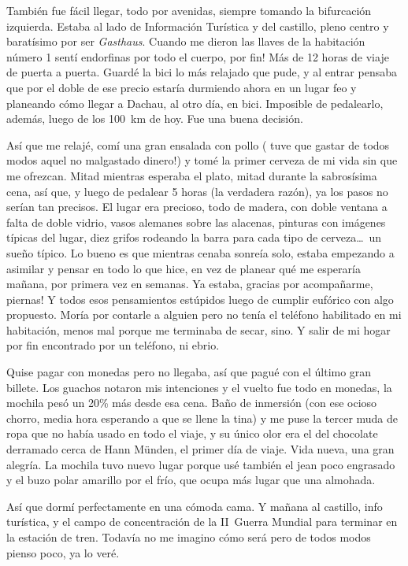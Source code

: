Tambi\'en fue f\'acil llegar, todo por avenidas, siempre tomando la
bifurcaci\'on izquierda. Estaba al lado de Informaci\'on Tur\'istica y del
castillo, pleno centro y barat\'isimo por ser \emph{Gasthaus}. Cuando me
dieron las llaves de la habitaci\'on n\'umero 1 sent\'i endorfinas por todo el
cuerpo, \textexclamdown por fin! M\'as de 12 horas de viaje de puerta a
puerta. Guard\'e la bici lo m\'as relajado que pude, y al entrar pensaba que
por el doble de ese precio estar\'ia durmiendo ahora en un lugar feo y
planeando c\'omo llegar a Dachau, al otro d\'ia, en bici. Imposible de
pedalearlo, adem\'as, luego de los 100~km de hoy. Fue una buena decisi\'on.

As\'i que me relaj\'e, com\'i una gran ensalada con pollo (\textexclamdown
tuve que gastar de todos modos aquel no malgastado dinero!) y tom\'e la primer
cerveza de mi vida sin que me ofrezcan. Mitad mientras esperaba el plato,
mitad durante la sabros\'isima cena, as\'i que, y luego de pedalear 5 horas
(la verdadera raz\'on), ya los pasos no ser\'ian tan precisos. El lugar era
precioso, todo de madera, con doble ventana a falta de doble vidrio, vasos
alemanes sobre las alacenas, pinturas con im\'agenes t\'ipicas del lugar, diez
grifos rodeando la barra para cada tipo de cerveza\ldots\ un sue\~no t\'ipico.
Lo bueno es que mientras cenaba sonre\'ia solo, estaba empezando a asimilar y
pensar en todo lo que hice, en vez de planear qu\'e me esperar\'ia ma\~nana,
por primera vez en semanas. Ya estaba, \textexclamdown gracias por
acompa\~narme, piernas! Y todos esos pensamientos est\'upidos luego de cumplir
euf\'orico con algo propuesto. Mor\'ia por contarle a alguien pero no ten\'ia
el tel\'efono habilitado en mi habitaci\'on, menos mal porque me terminaba de
secar, sino. Y salir de mi hogar por fin encontrado por un tel\'efono, ni
ebrio.

Quise pagar con monedas pero no llegaba, as\'i que pagu\'e con el \'ultimo
gran billete. Los guachos notaron mis intenciones y el vuelto fue todo en
monedas, la mochila pes\'o un 20\% m\'as desde esa cena. Ba\~no de inmersi\'on
(con ese ocioso chorro, media hora esperando a que se llene la tina) y me puse
la tercer muda de ropa que no hab\'ia usado en todo el viaje, y su \'unico
olor era el del chocolate derramado cerca de Hann M\"unden, el primer d\'ia de
viaje. Vida nueva, una gran alegr\'ia. La mochila tuvo nuevo lugar
porque us\'e tambi\'en el jean poco engrasado y el buzo polar amarillo por el
fr\'io, que ocupa m\'as lugar que una almohada.

As\'i que dorm\'i perfectamente en una c\'omoda cama. Y ma\~nana al castillo,
info tur\'istica, y el campo de concentraci\'on de la II~Guerra Mundial para
terminar en la estaci\'on de tren. Todav\'ia no me imagino c\'omo ser\'a pero
de todos modos pienso poco, ya lo ver\'e.

